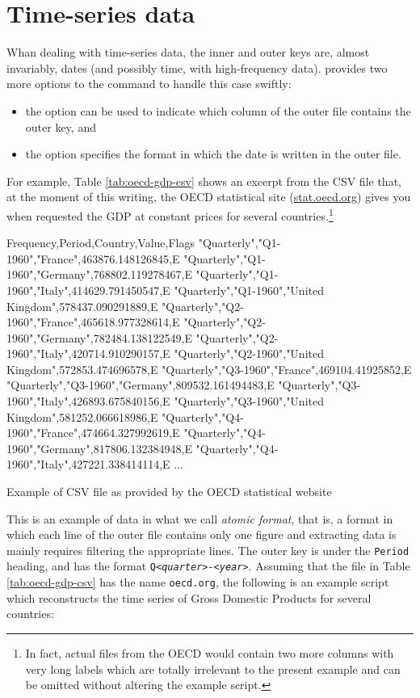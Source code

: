 \section{Time-series data}
\label{sec:join-timeser}

Whan dealing with time-series data, the inner and outer keys are,
almost invariably, dates (and possibly time, with high-frequency
data).  provides two more options to the  command
to handle this case swiftly:
\begin{itemize}
\item the  option can be used to indicate which column of
  the outer file contains the outer key, and
\item the  option specifies the format in which the date
  is written in the outer file.
\end{itemize}

For example, Table \ref{tab:oecd-gdp-csv} shows an excerpt from the
CSV file that, at the moment of this writing, the OECD statistical
site (\url{stat.oecd.org}) gives you when requested the GDP at
constant prices for several countries.\footnote{In fact, actual files
  from the OECD would contain two more columns with very long labels
  which are totally irrelevant to the present example and can be
  omitted without altering the example script.}

\begin{table}
\begin{code}
Frequency,Period,Country,Value,Flags
"Quarterly","Q1-1960","France",463876.148126845,E
"Quarterly","Q1-1960","Germany",768802.119278467,E
"Quarterly","Q1-1960","Italy",414629.791450547,E
"Quarterly","Q1-1960","United Kingdom",578437.090291889,E
"Quarterly","Q2-1960","France",465618.977328614,E
"Quarterly","Q2-1960","Germany",782484.138122549,E
"Quarterly","Q2-1960","Italy",420714.910290157,E
"Quarterly","Q2-1960","United Kingdom",572853.474696578,E
"Quarterly","Q3-1960","France",469104.41925852,E
"Quarterly","Q3-1960","Germany",809532.161494483,E
"Quarterly","Q3-1960","Italy",426893.675840156,E
"Quarterly","Q3-1960","United Kingdom",581252.066618986,E
"Quarterly","Q4-1960","France",474664.327992619,E
"Quarterly","Q4-1960","Germany",817806.132384948,E
"Quarterly","Q4-1960","Italy",427221.338414114,E
...
\end{code}
\label{tab:oecd-gdp-csv}  
\caption{Example of CSV file as provided by the OECD statistical website}
\end{table}

This is an example of data in what we call \emph{atomic format}, that
is, a format in which each line of the outer file contains only one
figure and extracting data is mainly requires filtering the
appropriate lines. The outer key is under the \texttt{Period} heading,
and has the format \texttt{Q\emph{<quarter>-<year>}}. Assuming that
the file in Table \ref{tab:oecd-gdp-csv} has the name
\texttt{oecd.org}, the following is an example script which
reconstructs the time series of Gross Domestic Products for several
countries:

